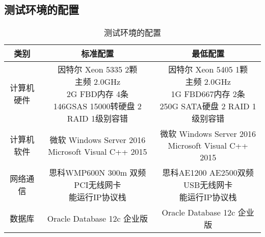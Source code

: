 \subsection{测试环境的配置}
\begin{table}[htbp]
\centering
\caption{测试环境的配置} \label{tab:test-environment}
\begin{tabular}{|c|c|c|}
    \hline
    类别 & 标准配置 & 最低配置 \\
    \hline
    计算机硬件 & \tabincell{c}{因特尔 Xeon 5335 2颗\\ 主频 2.0GHz\\ 2G FBD内存 4条\\ 146GSAS 15000转硬盘 2 RAID 1级别容错} & \tabincell{c}{因特尔 Xeon 5405 1颗\\ 主频 2.0GHz\\ 1G FBD667内存 2条\\ 250G SATA硬盘 2 RAID 1级别容错} \\
    \hline
    计算机软件 & \tabincell{c}{微软 Windows Server 2016\\ Microsoft Visual C++ 2015} & \tabincell{c}{微软 Windows Server 2016\\ Microsoft Visual C++ 2015} \\
    \hline
    网络通信 & \tabincell{c}{思科WMP600N 300m 双频 PCI无线网卡\\ 能运行IP协议栈} & \tabincell{c}{思科AE1200 AE2500双频USB无线网卡\\ 能运行IP协议栈} \\
    \hline
    数据库 & Oracle Database 12c 企业版 & Oracle Database 12c 企业版 \\
    \hline

\end{tabular}
\end{table}

